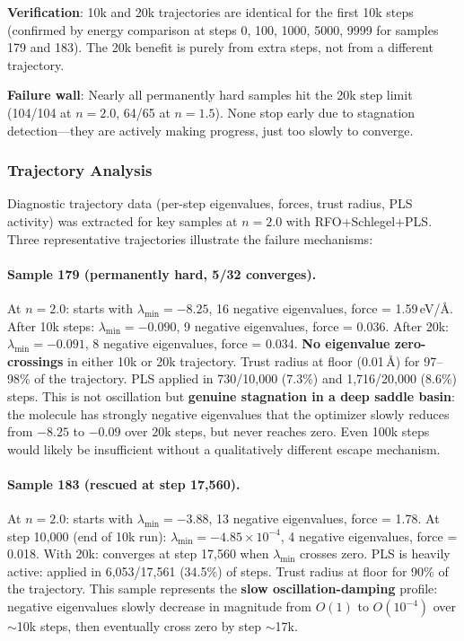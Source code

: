 \documentclass[11pt,a4paper]{article}
\theoremstyle{definition}
\begin{document}
\textbf{Verification}: 10k and 20k trajectories are identical for the first
10k steps (confirmed by energy comparison at steps 0, 100, 1000, 5000, 9999
for samples 179 and 183).  The 20k benefit is purely from extra steps, not
from a different trajectory.

\textbf{Failure wall}: Nearly all permanently hard samples hit the 20k step
limit (104/104 at $n=2.0$, 64/65 at $n=1.5$).  None stop early due to
stagnation detection---they are actively making progress, just too slowly
to converge.

\subsubsection{Trajectory Analysis}
\label{sec:trajectory-analysis}

Diagnostic trajectory data (per-step eigenvalues, forces, trust radius, PLS
activity) was extracted for key samples at $n=2.0$ with RFO+Schlegel+PLS.
Three representative trajectories illustrate the failure mechanisms:

\paragraph{Sample 179 (permanently hard, 5/32 converges).}
At $n=2.0$: starts with $\lambda_\text{min}=-8.25$, 16 negative eigenvalues,
force = 1.59\,eV/\AA.  After 10k steps: $\lambda_\text{min}=-0.090$,
9 negative eigenvalues, force = 0.036.  After 20k: $\lambda_\text{min}=-0.091$,
8 negative eigenvalues, force = 0.034.  \textbf{No eigenvalue zero-crossings}
in either 10k or 20k trajectory.  Trust radius at floor (0.01\,\AA) for
97--98\% of the trajectory.  PLS applied in 730/10{,}000 (7.3\%) and
1{,}716/20{,}000 (8.6\%) steps.  This is not oscillation but \textbf{genuine
stagnation in a deep saddle basin}: the molecule has strongly negative
eigenvalues that the optimizer slowly reduces from $-8.25$ to $-0.09$ over
20k steps, but never reaches zero.  Even 100k steps would likely be
insufficient without a qualitatively different escape mechanism.

\paragraph{Sample 183 (rescued at step 17{,}560).}
At $n=2.0$: starts with $\lambda_\text{min}=-3.88$, 13 negative eigenvalues,
force = 1.78.  At step 10{,}000 (end of 10k run): $\lambda_\text{min}=-4.85
\times10^{-4}$, 4 negative eigenvalues, force = 0.018.  With 20k: converges
at step 17{,}560 when $\lambda_\text{min}$ crosses zero.  PLS is heavily
active: applied in 6{,}053/17{,}561 (34.5\%) of steps.  Trust radius at floor
for 90\% of the trajectory.  This sample represents the \textbf{slow
oscillation-damping} profile: negative eigenvalues slowly decrease in
magnitude from $O(1)$ to $O(10^{-4})$ over $\sim$10k steps, then eventually
cross zero by step $\sim$17k.
\end{document}
